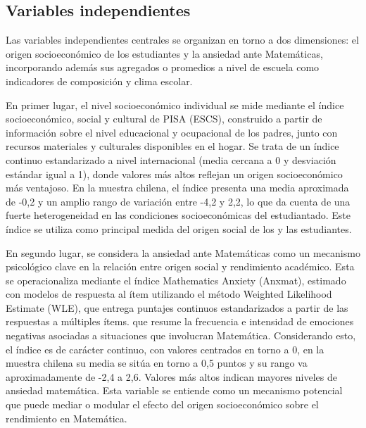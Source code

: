\documentclass[
  spanish,
  a4paper,
  oneside]{scrbook}
\begin{document}
\subsection{Variables independientes}\label{variables-independientes}

Las variables independientes centrales se organizan en torno a dos
dimensiones: el origen socioeconómico de los estudiantes y la ansiedad
ante Matemáticas, incorporando además sus agregados o promedios a nivel
de escuela como indicadores de composición y clima escolar.

En primer lugar, el nivel socioeconómico individual se mide mediante el
índice socioeconómico, social y cultural de PISA (ESCS), construido a
partir de información sobre el nivel educacional y ocupacional de los
padres, junto con recursos materiales y culturales disponibles en el
hogar. Se trata de un índice continuo estandarizado a nivel
internacional (media cercana a 0 y desviación estándar igual a 1), donde
valores más altos reflejan un origen socioeconómico más ventajoso. En la
muestra chilena, el índice presenta una media aproximada de -0,2 y un
amplio rango de variación entre -4,2 y 2,2, lo que da cuenta de una
fuerte heterogeneidad en las condiciones socioeconómicas del
estudiantado. Este índice se utiliza como principal medida del origen
social de los y las estudiantes.

En segundo lugar, se considera la ansiedad ante Matemáticas como un
mecanismo psicológico clave en la relación entre origen social y
rendimiento académico. Esta se operacionaliza mediante el índice
Mathematics Anxiety (Anxmat), estimado con modelos de respuesta al ítem
utilizando el método Weighted Likelihood Estimate (WLE), que entrega
puntajes continuos estandarizados a partir de las respuestas a múltiples
ítems. que resume la frecuencia e intensidad de emociones negativas
asociadas a situaciones que involucran Matemática. Considerando esto, el
índice es de carácter continuo, con valores centrados en torno a 0, en
la muestra chilena su media se sitúa en torno a 0,5 puntos y su rango va
aproximadamente de -2,4 a 2,6. Valores más altos indican mayores niveles
de ansiedad matemática. Esta variable se entiende como un mecanismo
potencial que puede mediar o modular el efecto del origen socioeconómico
sobre el rendimiento en Matemática.
\end{document}
